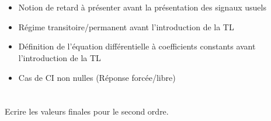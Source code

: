 \section*{}     
\begin{itemize}
\item Notion de retard à présenter avant la présentation des signaux usuels
\item Régime transitoire/permanent avant l'introduction de la TL
\item Définition de l'équation différentielle à coefficients constants avant 
      l'introduction de la TL
\item Cas de CI non nulles (Réponse forcée/libre)
\end{itemize}
\section*{}

\section*{}
Ecrire les valeurs finales pour le second ordre.
